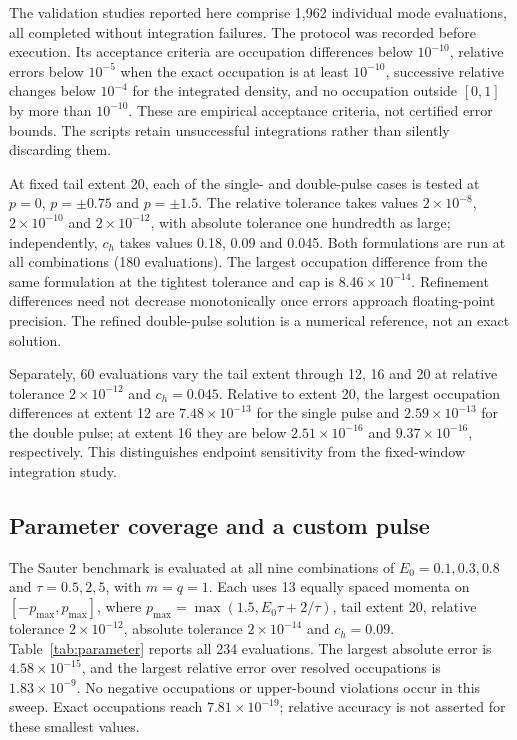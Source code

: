 \documentclass[a4paper,fleqn]{cas-dc}
\begin{document}
The validation studies reported here comprise 1,962 individual mode evaluations, all completed without integration failures. The protocol was recorded before execution. Its acceptance criteria are occupation differences below $10^{-10}$, relative errors below $10^{-5}$ when the exact occupation is at least $10^{-10}$, successive relative changes below $10^{-4}$ for the integrated density, and no occupation outside $[0,1]$ by more than $10^{-10}$. These are empirical acceptance criteria, not certified error bounds. The scripts retain unsuccessful integrations rather than silently discarding them.

At fixed tail extent 20, each of the single- and double-pulse cases is tested at $p=0$, $p=\pm0.75$ and $p=\pm1.5$. The relative tolerance takes values $2\times10^{-8}$, $2\times10^{-10}$ and $2\times10^{-12}$, with absolute tolerance one hundredth as large; independently, $c_h$ takes values 0.18, 0.09 and 0.045. Both formulations are run at all combinations (180 evaluations). The largest occupation difference from the same formulation at the tightest tolerance and cap is $8.46\times10^{-14}$. Refinement differences need not decrease monotonically once errors approach floating-point precision. The refined double-pulse solution is a numerical reference, not an exact solution.

Separately, 60 evaluations vary the tail extent through 12, 16 and 20 at relative tolerance $2\times10^{-12}$ and $c_h=0.045$. Relative to extent 20, the largest occupation differences at extent 12 are $7.48\times10^{-13}$ for the single pulse and $2.59\times10^{-13}$ for the double pulse; at extent 16 they are below $2.51\times10^{-16}$ and $9.37\times10^{-16}$, respectively. This distinguishes endpoint sensitivity from the fixed-window integration study.

\subsection{Parameter coverage and a custom pulse}

The Sauter benchmark is evaluated at all nine combinations of $E_0=0.1,0.3,0.8$ and $\tau=0.5,2,5$, with $m=q=1$. Each uses 13 equally spaced momenta on $[-p_{\max},p_{\max}]$, where $p_{\max}=\max(1.5,E_0\tau+2/\tau)$, tail extent 20, relative tolerance $2\times10^{-12}$, absolute tolerance $2\times10^{-14}$ and $c_h=0.09$. Table~\ref{tab:parameter} reports all 234 evaluations. The largest absolute error is $4.58\times10^{-15}$, and the largest relative error over resolved occupations is $1.83\times10^{-9}$. No negative occupations or upper-bound violations occur in this sweep. Exact occupations reach $7.81\times10^{-19}$; relative accuracy is not asserted for these smallest values.
\end{document}
